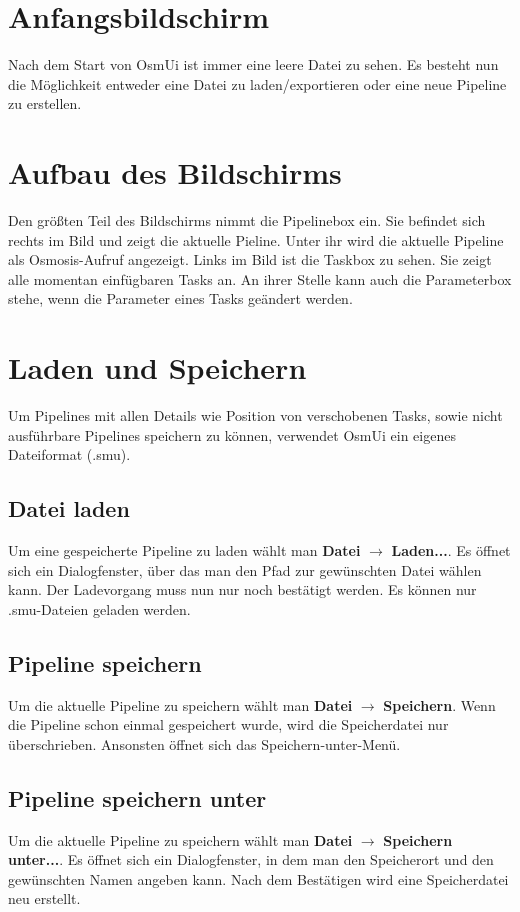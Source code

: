 \documentclass[a4paper,10pt]{scrartcl}
\begin{document}
\section{Anfangsbildschirm}
Nach dem Start von OsmUi ist immer eine leere Datei zu sehen. Es besteht nun die Möglichkeit entweder eine Datei zu laden/exportieren oder eine neue Pipeline zu erstellen.

\section{Aufbau des Bildschirms}
Den größten Teil des Bildschirms nimmt die Pipelinebox ein. Sie befindet sich rechts im Bild und zeigt die aktuelle Pieline. Unter ihr wird die aktuelle Pipeline als Osmosis-Aufruf angezeigt. Links im Bild ist die Taskbox zu sehen. Sie zeigt alle momentan einfügbaren Tasks an. An ihrer Stelle kann auch die Parameterbox stehe, wenn die Parameter eines Tasks geändert werden. 

\section{Laden und Speichern}
Um Pipelines mit allen Details wie Position von verschobenen Tasks, sowie nicht ausführbare Pipelines speichern zu können, verwendet OsmUi ein eigenes Dateiformat (.smu).
\subsection{Datei laden}
Um eine gespeicherte Pipeline zu laden wählt man \textbf{Datei} $\rightarrow$ \textbf{Laden...}. Es öffnet sich ein Dialogfenster, über das man den Pfad zur gewünschten Datei wählen kann. Der Ladevorgang muss nun nur noch bestätigt werden. Es können nur .smu-Dateien geladen werden.
\subsection{Pipeline speichern}
Um die aktuelle Pipeline zu speichern wählt man \textbf{Datei} $\rightarrow$ \textbf{Speichern}. Wenn die Pipeline schon einmal gespeichert wurde, wird die Speicherdatei nur überschrieben. Ansonsten öffnet sich das Speichern-unter-Menü. 
\subsection{Pipeline speichern unter}
Um die aktuelle Pipeline zu speichern wählt man \textbf{Datei} $\rightarrow$ \textbf{Speichern unter...}. Es öffnet sich ein Dialogfenster, in dem man den Speicherort und den gewünschten Namen angeben kann. Nach dem Bestätigen wird eine Speicherdatei neu erstellt. 
\end{document}
